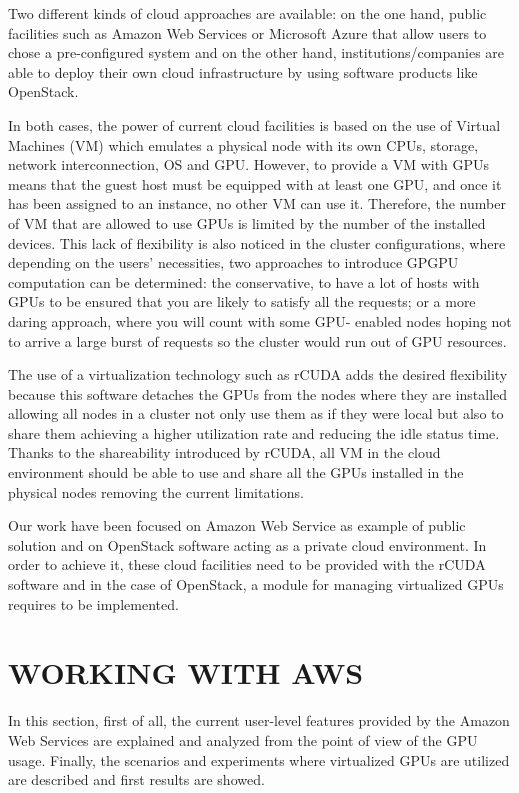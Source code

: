 \documentclass[a4paper,twoside]{article}
\begin{document}
Two different kinds of cloud approaches are available:
on the one hand, public facilities such as Amazon Web Services or 
Microsoft Azure that allow users to chose a pre-configured system  
and on the other hand, institutions/companies 
are able to deploy their own cloud infrastructure by using software products 
like OpenStack.  

In both cases, the power of current cloud facilities is based on the use 
of Virtual Machines (VM) which  
emulates a physical node with its own 
CPUs, storage, network interconnection, OS and GPU. 
However, to provide a VM with GPUs means
that the guest host must be equipped with at least one GPU, and
once it has been assigned to an instance, no other VM can use
it. Therefore, the number of VM that are allowed to use GPUs is 
limited by the number of the installed devices. This lack of 
flexibility is also noticed in the cluster configurations, where 
depending on the users’ necessities, 
two approaches to introduce GPGPU computation can be determined:
the conservative, to have a lot of hosts with GPUs to be
ensured that you are likely to satisfy all the requests; or a
more daring approach, where you will count with some GPU-
enabled nodes hoping not to arrive a large burst of requests
so the cluster would run out of GPU resources.

The use of a virtualization technology such as {rCUDA} adds 
the desired flexibility because this software detaches the GPUs 
from the nodes where they are installed allowing all nodes in a cluster
not only use them as if they were local but also to share them 
achieving a higher utilization rate and reducing the idle status time.
Thanks to the shareability introduced by {rCUDA}, all VM in the cloud 
environment should be able to use and share all the GPUs installed in 
the physical nodes removing the current limitations. 

Our work have been focused on Amazon Web Service as example of public 
solution and on OpenStack software acting as a private cloud environment. 
In order to achieve it, these cloud facilities need to be provided with the {rCUDA} software and 
in the case of OpenStack, a module for managing virtualized GPUs 
requires to be implemented.  



\section{\uppercase{Working with AWS}}
\label{sec:workingaws}
In this section, first of all, the current user-level features 
provided by the Amazon Web Services are explained and analyzed 
from the point of view of the GPU usage. 
Finally, the scenarios and experiments where virtualized GPUs are utilized are 
described and first results are showed.
\end{document}
